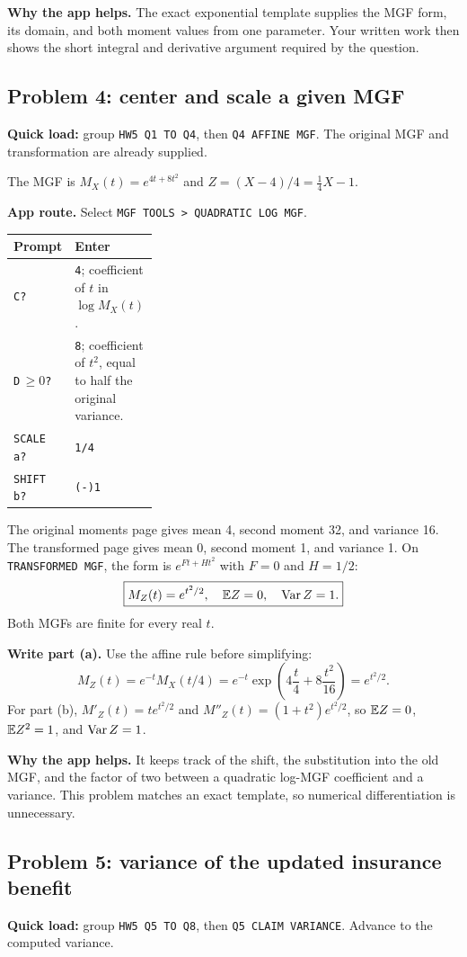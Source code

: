 \textbf{Why the app helps.} The exact exponential template supplies the MGF form, its domain, and both moment values from one parameter. Your written work then shows the short integral and derivative argument required by the question.

\subsection{Problem 4: center and scale a given MGF}
\textbf{Quick load:} group \texttt{HW5 Q1 TO Q4}, then \texttt{Q4 AFFINE MGF}. The original MGF and transformation are already supplied.

The MGF is $M_X(t)=e^{4t+8t^2}$ and $Z=(X-4)/4=\frac14X-1$.

\textbf{App route.} Select \texttt{MGF TOOLS > QUADRATIC LOG MGF}.
\begin{center}
\begin{tabularx}{\linewidth}{@{}p{0.32\linewidth}X@{}}
\toprule Prompt & Enter\\\midrule
\texttt{C?} & \texttt{4}; coefficient of $t$ in $\log M_X(t)$.\\
\texttt{D}\,$\ge0$\texttt{?} & \texttt{8}; coefficient of $t^2$, equal to half the original variance.\\
\texttt{SCALE a?} & \texttt{1/4}\\
\texttt{SHIFT b?} & \texttt{(-)1}\\\bottomrule
\end{tabularx}
\end{center}
The original moments page gives mean 4, second moment 32, and variance 16. The transformed page gives mean 0, second moment 1, and variance 1. On \texttt{TRANSFORMED MGF}, the form is $e^{Ft+Ht^2}$ with $F=0$ and $H=1/2$:
\[
\boxed{M_Z(t)=e^{t^2/2},\quad \mathbb E Z=0,\quad \operatorname{Var} Z=1.}
\]
Both MGFs are finite for every real $t$.

\textbf{Write part (a).} Use the affine rule before simplifying:
\[
M_Z(t)=e^{-t}M_X(t/4)
=e^{-t}\exp\!\left(4\frac t4+8\frac{t^2}{16}\right)=e^{t^2/2}.
\]
For part (b), $M'_Z(t)=te^{t^2/2}$ and $M''_Z(t)=(1+t^2)e^{t^2/2}$, so $\mathbb E Z=0$, $\mathbb E Z^2=1$, and $\operatorname{Var} Z=1$.

\textbf{Why the app helps.} It keeps track of the shift, the substitution into the old MGF, and the factor of two between a quadratic log-MGF coefficient and a variance. This problem matches an exact template, so numerical differentiation is unnecessary.

\subsection{Problem 5: variance of the updated insurance benefit}
\textbf{Quick load:} group \texttt{HW5 Q5 TO Q8}, then \texttt{Q5 CLAIM VARIANCE}. Advance to the computed variance.

